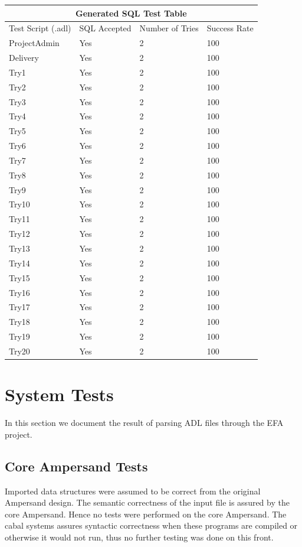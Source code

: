 \documentclass[12pt, svgnames]{article}
\begin{document}
\begin{adjustwidth}{-0.5cm}{}   
    \begin{tabular}[h!]{ |p{5cm}||p{3cm}|p{3cm}|p{3cm}|  }
        \hline
        \multicolumn{4}{|c|}{Generated SQL Test Table} \\
        \hline
        Test Script (.adl) & SQL Accepted & Number of Tries & Success Rate\\
        \hline
        ProjectAdmin & Yes    &2&   100\\
        Delivery&   Yes  & 2   &100\\
        Try1 &Yes & 2&  100\\
        Try2 &Yes & 2&  100\\
        Try3&   Yes  & 2&100\\
        Try4& Yes  & 2   &100\\
        Try5& Yes  & 2&100\\
        Try6& Yes  & 2&100\\
        Try7& Yes  & 2&100\\
        Try8& Yes  & 2&100\\
        Try9& Yes  & 2&100\\
        Try10& Yes  & 2&100\\
        Try11& Yes  & 2&100\\
        Try12& Yes  & 2&100\\
        Try13& Yes  & 2&100\\
        Try14& Yes  & 2&100\\
        Try15& Yes  & 2&100\\
        Try16& Yes  & 2&100\\
        Try17& Yes  & 2&100\\
        Try18& Yes  & 2&100\\
        Try19& Yes  & 2&100\\
        Try20& Yes  & 2 &100\\
        \hline
    \end{tabular}
\end{adjustwidth}

\section{System Tests}
In this section we document the result of parsing ADL files through the EFA project.   

\subsection {Core Ampersand Tests}
Imported data structures were assumed to be correct from the original Ampersand 
design. The semantic correctness of the input file is assured by the core Ampersand. Hence no tests were performed on the core Ampersand.
The cabal systems assures syntactic correctness when these programs are compiled 
or otherwise it would not run, thus no further testing was done on this 
front.
\end{document}
